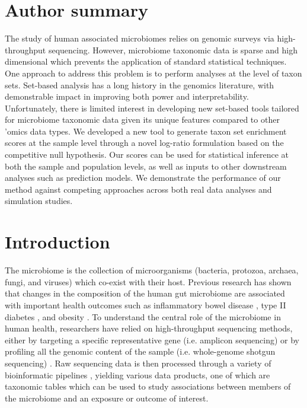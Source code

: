 \documentclass[10pt,letterpaper]{article}
\begin{document}
\section*{Author summary}
The study of human associated microbiomes relies on genomic surveys via high-throughput sequencing. However, microbiome taxonomic data is sparse and high dimensional which prevents the application of standard statistical techniques. One approach to address this problem is to perform analyses at the level of taxon sets. Set-based analysis has a long history in the genomics literature, with demonstrable impact in improving both power and interpretability. Unfortunately, there is limited interest in developing new set-based tools tailored for microbiome taxonomic data given its unique features compared to other 'omics data types. We developed a new tool to generate taxon set enrichment scores at the sample level through a novel log-ratio formulation based on the competitive null hypothesis. Our scores can be used for statistical inference at both the sample and population levels, as well as inputs to other downstream analyses such as prediction models. We demonstrate the performance of our method against competing approaches across both real data analyses and simulation studies. 

\linenumbers

\section*{Introduction} \label{introduction}
The microbiome is the collection of microorganisms (bacteria, protozoa, archaea, fungi, and viruses) which co-exist with their host. Previous research has shown that changes in the composition of the human gut microbiome are associated with important health outcomes such as inflammatory bowel disease \cite{proctor2019}, type II diabetes \cite{sharma2019a}, and obesity \cite{aoun2020}. To understand the central role of the microbiome in human health, researchers have relied on high-throughput sequencing methods, either by targeting a specific representative gene (i.e. amplicon sequencing) or by profiling all the genomic content of the sample (i.e. whole-genome shotgun sequencing) \cite{cho2012}. Raw sequencing data is then processed through a variety of bioinformatic pipelines \cite{callahan2016, truong2015}, yielding various data products, one of which are taxonomic tables which can be used to study associations between members of the microbiome and an exposure or outcome of interest. 
\end{document}

